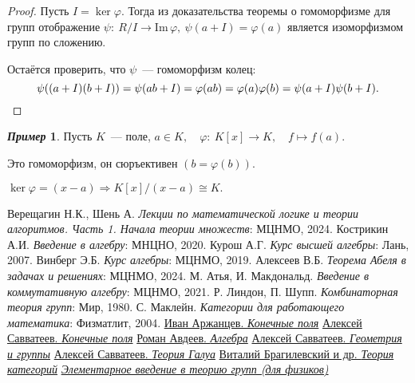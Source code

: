 \documentclass[a4paper, 14pt]{extarticle}
\newcommand{\n}{\par}
\newcommand{\im}{\mathrm{Im} \,}
\renewcommand{\phi}{\varphi}
\theoremstyle{definition}
\newtheorem*{exmpl*}{\textit{Пример}}
\theoremstyle{plain}
\numberwithin{theorem}{section}
\numberwithin{definition}{section}
\numberwithin{statement}{section}
\numberwithin{lemma}{section}
\numberwithin{consequence}{section}
\begin{document}
	\begin{proof}
		Пусть ${I = \ker \phi.}$ Тогда из доказательства теоремы о гомоморфизме для групп отображение ${\psi{:} \ R/I \rightarrow \im \phi, \ \psi(a + I) = \phi(a)}$ является изоморфизмом групп по сложению.\n
		Остаётся проверить, что $\psi$~--- гомоморфизм колец:
		\begin{equation*}
			\psi((a + I)(b + I)) = \psi(ab + I) = \phi(ab) = \phi(a)\phi(b) = \psi(a + I)\psi(b + I). \qedhere
		\end{equation*}
	\end{proof}
	\begin{exmpl*}
		Пусть $K$~--- поле, ${a \in K, \quad \phi{:} \ K[x] \rightarrow K, \quad f \mapsto f(a).}$ \n
		Это гомоморфизм, он сюръективен ${(b = \phi(b)).}$ \n
		$\ker \phi = (x - a) \Longrightarrow K[x]/(x - a) \cong K.$
	\end{exmpl*}
	\newpage
	\begin{thebibliography}{99}
		 Верещагин Н.К., Шень А.
		\textit{Лекции по математической логике и теории алгоритмов. Часть 1. Начала теории множеств}: МЦНМО, 2024.
		 Кострикин А.И. \textit{Введение в алгебру}: МНЦНО, 2020.
		 Курош А.Г. \textit{Курс высшей алгебры}: Лань, 2007.
		 Винберг Э.Б. \textit{Курс алгебры}: МЦНМО, 2019.
		 Алексеев В.Б. \textit{Теорема Абеля в задачах и решениях}: МЦНМО, 2024.
		 М. Атья, И. Макдональд. \textit{Введение в коммутативную алгебру}: МЦНМО, 2021.
		 Р. Линдон, П. Шупп. \textit{Комбинаторная теория групп}: Мир, 1980.
		 С. Маклейн. \textit{Категории для работающего математика}: Физматлит, 2004.
		 \href{https://www.youtube.com/watch?v=9PTiaQODKiA}{Иван Аржанцев. \textit{Конечные поля}}
		 \href{https://youtube.com/playlist?list=PLH3NNipqeM1vcHnP4czWemq5DyBw9MXxn&si=UFBR6POWzySgFqPt}{Алексей Савватеев. \textit{Конечные поля}}
		 \href{https://youtube.com/playlist?list=PLEwK9wdS5g0pxQ2ThGS3ObFwm4h1Ll0Kr&si=AM33kfEJxKFqNR-k}{Роман Авдеев. \textit{Алгебра}}
		 \href{https://youtube.com/playlist?list=PLlx2izuC9gjgZsBALx2ZF7IMGoNl07A9l&si=9X5Oosl5a53UTlTb}{Алексей Савватеев. \textit{Геометрия и группы}}
		 \href{https://youtube.com/playlist?list=PLgEpoT7yAl9VWebUfw4uOlut1ZaoFjFcb&si=yM6DjTk5Cenofg5U}{Алексей Савватеев. \textit{Теория Галуа}}
		 \href{https://youtube.com/playlist?list=PLvPsfYrGz3wsX3Z5KuuEVYhijDxhKCDDD&si=eh_MI9GO0mYzxZMU}{Виталий Брагилевский и др. \textit{Теория категорий}}
		 \href{https://youtube.com/playlist?list=PLnbH8YQPwKblIpRi0ARO2VadnMwntvF51&si=qXQx9-xB7_arfxB8}{\textit{Элементарное введение в теорию групп (для физиков)}}
	\end{thebibliography}
\end{document}
